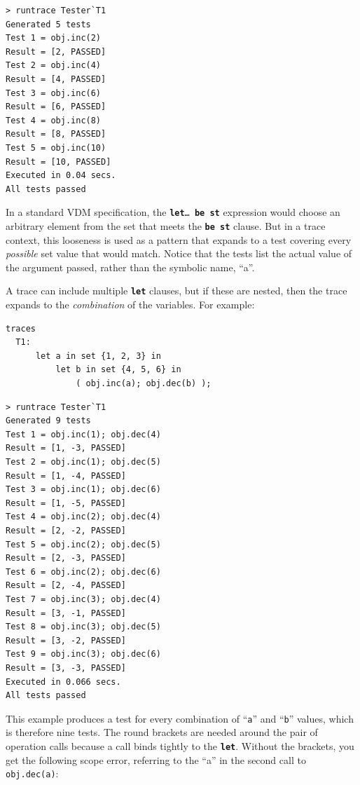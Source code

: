 \documentclass{overturerepchap}
\begin{document}
\lstset{style=tool,language=}
\begin{lstlisting}[escapechar=@]
> runtrace Tester`T1
Generated 5 tests
Test 1 = obj.inc(2)
Result = [2, PASSED]
Test 2 = obj.inc(4)
Result = [4, PASSED]
Test 3 = obj.inc(6)
Result = [6, PASSED]
Test 4 = obj.inc(8)
Result = [8, PASSED]
Test 5 = obj.inc(10)
Result = [10, PASSED]
Executed in 0.04 secs. 
All tests passed
\end{lstlisting}
\lstset{style=mystyle}
\lstset{language=VDM++}
\normalsize

\noindent In a standard VDM specification, the \texttt{\textbf{let}\ldots\
\textbf{be st}} expression would choose an arbitrary element from the set that
meets the \texttt{\textbf{be st}} clause. But in a trace context, this
looseness is used as a pattern that expands to a test covering every
\emph{possible} set value that would match. Notice that the tests list the
actual value of the argument passed, rather than the symbolic name, ``a''.

A trace can include multiple \texttt{\textbf{let}} clauses, but if these are nested, then
the trace expands to the \emph{combination} of the variables. For example:

\small
\begin{lstlisting}
traces
  T1:
      let a in set {1, 2, 3} in
          let b in set {4, 5, 6} in
              ( obj.inc(a); obj.dec(b) );
\end{lstlisting}

\lstset{style=tool,language=}
\begin{lstlisting}[escapechar=@]
> runtrace Tester`T1
Generated 9 tests
Test 1 = obj.inc(1); obj.dec(4)
Result = [1, -3, PASSED]
Test 2 = obj.inc(1); obj.dec(5)
Result = [1, -4, PASSED]
Test 3 = obj.inc(1); obj.dec(6)
Result = [1, -5, PASSED]
Test 4 = obj.inc(2); obj.dec(4)
Result = [2, -2, PASSED]
Test 5 = obj.inc(2); obj.dec(5)
Result = [2, -3, PASSED]
Test 6 = obj.inc(2); obj.dec(6)
Result = [2, -4, PASSED]
Test 7 = obj.inc(3); obj.dec(4)
Result = [3, -1, PASSED]
Test 8 = obj.inc(3); obj.dec(5)
Result = [3, -2, PASSED]
Test 9 = obj.inc(3); obj.dec(6)
Result = [3, -3, PASSED]
Executed in 0.066 secs. 
All tests passed
\end{lstlisting}
\lstset{style=mystyle}
\lstset{language=VDM++}
\normalsize

\noindent This example produces a test for every combination of ``\texttt{a}''
and ``\texttt{b}'' values, which is therefore nine tests. The round brackets
are needed around the pair of operation calls because a call binds tightly to
the \texttt{\textbf{let}}. Without the brackets, you get the following scope
error, referring to the ``a'' in the second call to \texttt{obj.dec(a)}:
\end{document}
